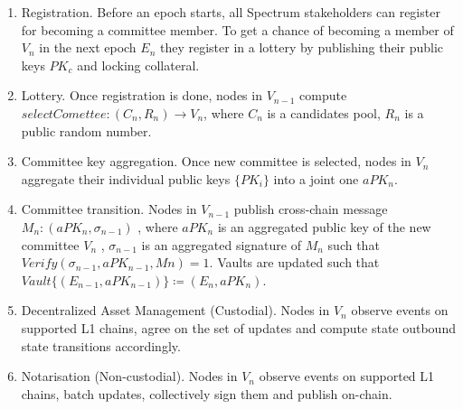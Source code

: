 \begin{enumerate}
    \item Registration.
    Before an epoch starts, all Spectrum stakeholders can register for becoming a committee member.
    To get a chance of becoming a member of $V_n$ in the next epoch $E_n$ they register in a lottery
    by publishing their public keys $PK_c$ and locking collateral.
    \item Lottery.
    Once registration is done, nodes in $V_{n-1}$ compute ${selectComettee: (C_n, R_n) \rightarrow V_n}$,
    where  $C_n$ is a candidates pool, $R_n$ is a public random number.
    \item Committee key aggregation.
    Once new committee is selected, nodes in $V_n$ aggregate their individual public keys $\{PK_i\}$ into
    a joint one $aPK_n$.
    \item Committee transition.
    Nodes in $V_{n-1}$ publish cross-chain message ${M_n : (aPK_n, \sigma_{n-1})}$ , where $aPK_n$ is
    an aggregated public key of the new committee $V_n$ , $\sigma_{n-1}$ is an aggregated signature of
    $M_n$ such that ${Verify(\sigma_{n-1}, aPK_{n-1}, Mn) = 1}$.
    Vaults are updated such that ${Vault\{(E_{n-1}, aPK_{n-1})\} \coloneqq (E_n, aPK_n)}$.
    \item Decentralized Asset Management (Custodial).
    Nodes in $V_n$ observe events on supported L1 chains, agree on the set of updates
    and compute state outbound state transitions accordingly.
    \item Notarisation (Non-custodial).
    Nodes in $V_n$ observe events on supported L1 chains, batch updates, collectively sign them and
    publish on-chain.
\end{enumerate}